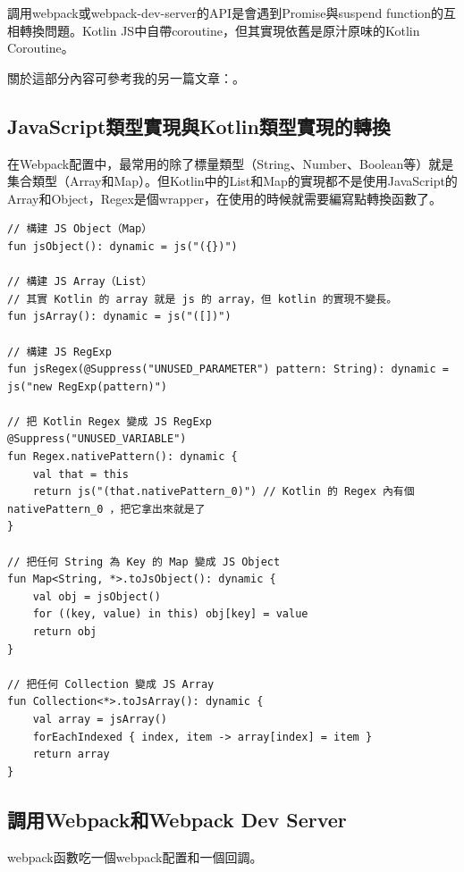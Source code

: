 調用webpack或webpack-dev-server的API是會遇到Promise與suspend function的互相轉換問題。Kotlin JS中自帶coroutine，但其實現依舊是原汁原味的Kotlin Coroutine。

關於這部分內容可參考我的另一篇文章：。

\subsection*{JavaScript類型實現與Kotlin類型實現的轉換}

在Webpack配置中，最常用的除了標量類型（String、Number、Boolean等）就是集合類型（Array和Map）。但Kotlin中的List和Map的實現都不是使用JavaScript的Array和Object，Regex是個wrapper，在使用的時候就需要編寫點轉換函數了。

\begin{lstlisting}
// 構建 JS Object（Map）
fun jsObject(): dynamic = js("({})") 

// 構建 JS Array（List）
// 其實 Kotlin 的 array 就是 js 的 array，但 kotlin 的實現不變長。
fun jsArray(): dynamic = js("([])") 

// 構建 JS RegExp
fun jsRegex(@Suppress("UNUSED_PARAMETER") pattern: String): dynamic = js("new RegExp(pattern)")

// 把 Kotlin Regex 變成 JS RegExp
@Suppress("UNUSED_VARIABLE")
fun Regex.nativePattern(): dynamic {
    val that = this
    return js("(that.nativePattern_0)") // Kotlin 的 Regex 內有個 nativePattern_0 ，把它拿出來就是了
}

// 把任何 String 為 Key 的 Map 變成 JS Object
fun Map<String, *>.toJsObject(): dynamic {
    val obj = jsObject()
    for ((key, value) in this) obj[key] = value
    return obj
}

// 把任何 Collection 變成 JS Array
fun Collection<*>.toJsArray(): dynamic {
    val array = jsArray()
    forEachIndexed { index, item -> array[index] = item }
    return array
}
\end{lstlisting}

\subsection*{調用Webpack和Webpack Dev Server}

webpack函數吃一個webpack配置和一個回調。

